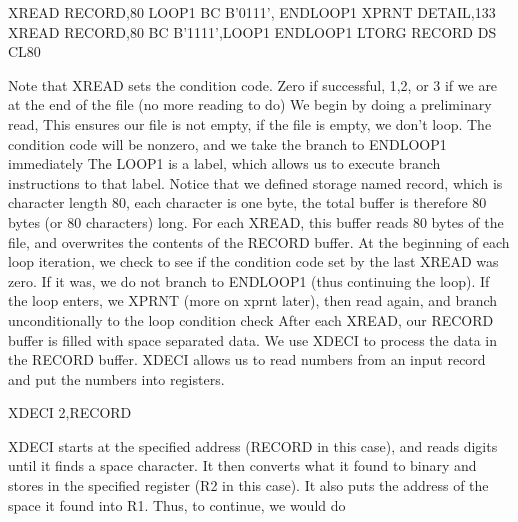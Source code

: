 \documentclass{report}
\begin{document}
\begin{itemize}
                    \begin{cppcode}
                            XREAD RECORD,80
                    LOOP1   BC    B'0111', ENDLOOP1
                            XPRNT DETAIL,133
                            XREAD RECORD,80
                            BC    B'1111',LOOP1
                    ENDLOOP1
                            LTORG
                    RECORD  DS    CL80
                    \end{cppcode}
                    \bigbreak \noindent 
                    Note that XREAD sets the condition code. Zero if successful, 1,2, or 3 if we are at the end of the file (no more reading to do)
                    \bigbreak \noindent 
                    We begin by doing a preliminary read, This ensures our file is not empty, if the file is empty, we don't loop. The condition code will be nonzero, and we take the branch to ENDLOOP1 immediately
                    \bigbreak \noindent 
                    The LOOP1 is a label, which allows us to execute branch instructions to that label. Notice that we defined storage named record, which is character length 80, each character is one byte, the total buffer is therefore 80 bytes (or 80 characters) long. For each XREAD, this buffer reads 80 bytes of the file, and overwrites the contents of the RECORD buffer. At the beginning of each loop iteration, we check to see if the condition code set by the last XREAD was zero. If it was, we do not branch to ENDLOOP1 (thus continuing the loop). 
                    \bigbreak \noindent 
                    If the loop enters, we XPRNT (more on xprnt later), then read again, and branch unconditionally to the loop condition check
                    \bigbreak \noindent 
                    After each XREAD, our RECORD buffer is filled with space separated data. We use XDECI to process the data in the RECORD buffer. XDECI allows us to read numbers from an input record and put the numbers into registers.
                    \bigbreak \noindent 
                    \begin{cppcode}
                    XDECI 2,RECORD
                    \end{cppcode}
                    \bigbreak \noindent 
                    XDECI starts at the specified address (RECORD in this case), and reads digits until it finds a space character. It then converts what it found to binary and stores in the specified register (R2 in this case). It also puts the address of the space it found into R1. Thus, to continue, we would do
                    \bigbreak \noindent 

\end{itemize}
\end{document}
